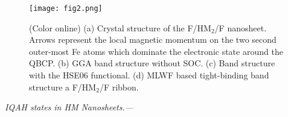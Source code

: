 \documentclass[twocolumn,english,prb,showpacs]{revtex4-1}
\begin{document}



\begin{figure}
\centering{}
\texttt{[image: fig2.png]}
\caption{(Color online)
{(a) Crystal structure of the F/HM$_{2}$/F nanosheet. Arrows represent the local magnetic momentum on the two second outer-most Fe atoms which dominate the electronic state around the QBCP. (b) GGA band structure without SOC. (c) Band structure with the HSE06 functional. (d) MLWF based tight-binding band structure a F/HM$_{2}$/F ribbon.}
\label{fig:huc-qahe}}
\end{figure}
\vspace{3mm}
\noindent\textit{IQAH states in HM Nanosheets.---}
\end{document}
